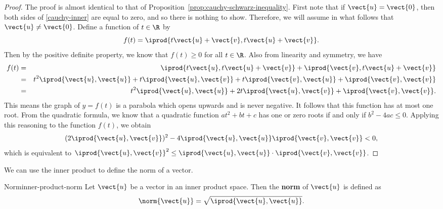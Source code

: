 \begin{proof}
  The proof is almost identical to that of
  Proposition~\ref{prop:cauchy-schwarz-inequality}.  First note that if
  $\vect{u}=\vect{0}$, then both sides of {\eqref{cauchy-inner}} are
  equal to zero, and so there is nothing to show. Therefore, we will
  assume in what follows that $\vect{u}\neq \vect{0}$.  Define a
  function of $t\in \R$ by
  \begin{equation*}
    f(t) = \iprod{t\vect{u}+\vect{v}, t\vect{u}+\vect{v}}.
  \end{equation*}
  Then by the positive definite property, we know that $f(t)\geq 0$
  for all $t\in \R$.  Also from linearity and symmetry, we have
  \begin{eqnarray*}
    f(t) &=& \iprod{t\vect{u}, t\vect{u}+\vect{v}} +
             \iprod{\vect{v}, t\vect{u}+\vect{v}} \\
         &=& t^2\iprod{\vect{u}, \vect{u}}+t\iprod{\vect{u}, \vect{v}} + t\iprod{\vect{v}, \vect{u}}+
             \iprod{\vect{v}, \vect{v}} \\
         &=&t^2\iprod{\vect{u},\vect{u}}+2t\iprod{\vect{u}, \vect{v}}
             + \iprod{\vect{v}, \vect{v}}.
  \end{eqnarray*}
  This means the graph of $y=f(t)$ is a parabola which opens upwards
  and is never negative. It follows that this function has at most one
  root. From the quadratic formula, we know that a quadratic function
  $at^2+bt+c$ has one or zero roots if and only if $b^2-4ac\leq
  0$. Applying this reasoning to the function $f(t)$, we obtain
  \begin{equation*}
    (2\iprod{\vect{u}, \vect{v}})^2
    - 4\iprod{\vect{u},\vect{u}}\iprod{\vect{v},\vect{v}} < 0,
  \end{equation*}
  which is equivalent to
  $\iprod{\vect{u},\vect{v}}^2 \leq \iprod{\vect{u},\vect{u}} \cdot
  \iprod{\vect{v},\vect{v}}$.
\end{proof}

We can use the inner product to define the norm of a vector.

\begin{definition}{Norm}{inner-product-norm}
  Let $\vect{u}$ be a vector in an inner product space. Then the
  \textbf{norm}%
   of $\vect{u}$ is defined as
  \begin{equation*}
    \norm{\vect{u}} = \sqrt{\iprod{\vect{u},\vect{u}}}.
  \end{equation*}
\end{definition}

